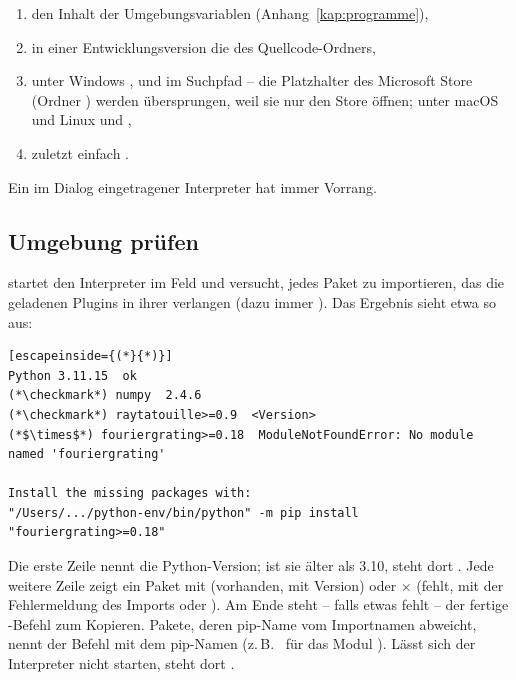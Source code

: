 \begin{enumerate}
  \item den Inhalt der Umgebungsvariablen 
        (Anhang~\ref{kap:programme}),
  \item in einer Entwicklungsversion die  des Quellcode-Ordners,
  \item unter Windows ,  und  im Suchpfad – die Platzhalter
        des Microsoft Store (Ordner ) werden übersprungen, weil sie nur den
        Store öffnen; unter macOS und Linux  und ,
  \item zuletzt einfach .
\end{enumerate}

Ein im Dialog eingetragener Interpreter hat immer Vorrang.

\subsection{Umgebung prüfen}\label{sec:umgebung-pruefen}

 startet den Interpreter im Feld und versucht, jedes Paket zu
importieren, das die geladenen Plugins in ihrer  verlangen (dazu immer
). Das Ergebnis sieht etwa so aus:

\begin{lstlisting}[escapeinside={(*}{*)}]
Python 3.11.15  ok
(*\checkmark*) numpy  2.4.6
(*\checkmark*) raytatouille>=0.9  <Version>
(*$\times$*) fouriergrating>=0.18  ModuleNotFoundError: No module named 'fouriergrating'

Install the missing packages with:
"/Users/.../python-env/bin/python" -m pip install "fouriergrating>=0.18"
\end{lstlisting}

Die erste Zeile nennt die Python-Version; ist sie älter als 3.10, steht dort
. Jede weitere Zeile zeigt ein Paket mit
\checkmark{} (vorhanden, mit Version) oder $\times$ (fehlt, mit der Fehlermeldung des Imports
oder ). Am Ende steht – falls etwas fehlt – der
fertige -Befehl zum Kopieren. Pakete, deren pip-Name vom Importnamen abweicht, nennt
der Befehl mit dem pip-Namen (z.\,B.\  für das Modul
). Lässt sich der Interpreter nicht starten, steht dort
.

